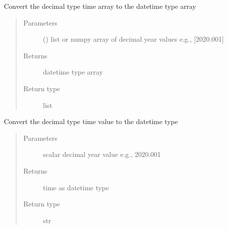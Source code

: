 \documentclass[letterpaper,10pt,english]{sphinxmanual}
\begin{document}
\begin{fulllineitems}
\label{\detokenize{modules/analysis_support:dtwhaclustering.analysis_support.dec2dt}}
\sphinxAtStartPar
Convert the decimal type time array to the date\sphinxhyphen{}time type array
\begin{quote}\begin{description}
\item[{Parameters}] \leavevmode
\sphinxAtStartPar
{} () \textendash{} list or numpy array of decimal year values e.g., {[}2020.001{]}

\item[{Returns}] \leavevmode
\sphinxAtStartPar
date\sphinxhyphen{}time type array

\item[{Return type}] \leavevmode
\sphinxAtStartPar
list

\end{description}\end{quote}

\end{fulllineitems}


\begin{fulllineitems}
\label{\detokenize{modules/analysis_support:dtwhaclustering.analysis_support.dec2dt_scalar}}
\sphinxAtStartPar
Convert the decimal type time value to the date\sphinxhyphen{}time type
\begin{quote}\begin{description}
\item[{Parameters}] \leavevmode
\sphinxAtStartPar
{} \textendash{} scalar decimal year value e.g., 2020.001

\item[{Returns}] \leavevmode
\sphinxAtStartPar
time as datetime type

\item[{Return type}] \leavevmode
\sphinxAtStartPar
str

\end{description}\end{quote}

\end{fulllineitems}
\end{document}
